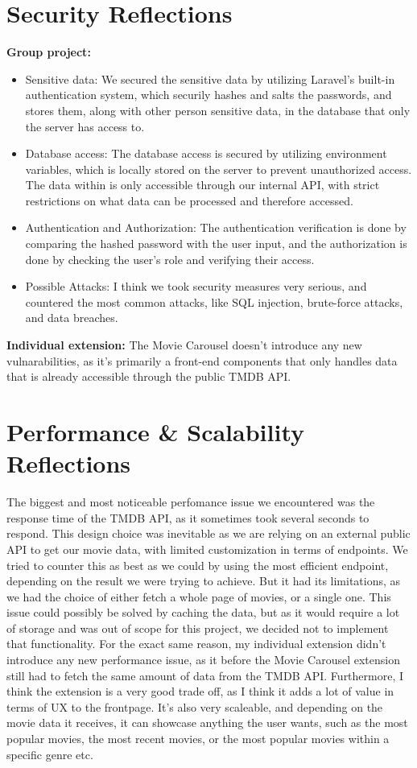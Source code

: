 \documentclass[letterpaper,twocolumn]{article}
\begin{document}
\section{Security Reflections}
\textbf{Group project:}
\begin{itemize}
  \item Sensitive data: We secured the sensitive data by utilizing Laravel's built-in authentication system, which securily hashes and salts the passwords, and stores them, along with other person sensitive data, in the database that only the server has access to. 
  \item Database access: The database access is secured by utilizing environment variables, which is locally stored on the server to prevent unauthorized access. The data within is only accessible through our internal API, with strict restrictions on what data can be processed and therefore accessed.
  \item Authentication and Authorization: The authentication verification is done by comparing the hashed password with the user input, and the authorization is done by checking the user's role and verifying their access.
  \item Possible Attacks: I think we took security measures very serious, and countered the most common attacks, like SQL injection, brute-force attacks, and data breaches.
\end{itemize}
\textbf{Individual extension:}
The Movie Carousel doesn't introduce any new vulnarabilities, as it's primarily a front-end components that only handles data that is already accessible through the public TMDB API.

\section{Performance & Scalability Reflections}
The biggest and most noticeable perfomance issue we encountered was the response time of the TMDB API, as it sometimes took several seconds to respond. This design choice was inevitable as we are relying on an external public API to get our movie data, with limited customization in terms of endpoints.
We tried to counter this as best as we could by using the most efficient endpoint, depending on the result we were trying to achieve. But it had its limitations, as we had the choice of either fetch a whole page of movies, or a single one.
This issue could possibly be solved by caching the data, but as it would require a lot of storage and was out of scope for this project, we decided not to implement that functionality.
For the exact same reason, my individual extension didn't introduce any new performance issue, as it before the Movie Carousel extension still had to fetch the same amount of data from the TMDB API. Furthermore, I think the extension is a very good trade off, as I think it adds a lot of value in terms of UX to the frontpage. It's also very scaleable, and depending on the movie data it receives, it can showcase anything the user wants, such as the most popular movies, the most recent movies, or the most popular movies within a specific genre etc.
\end{document}
